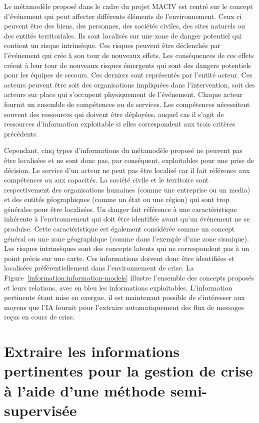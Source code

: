 Le métamodèle proposé dans le cadre du projet MACIV est centré sur le concept d'événement qui peut affecter différents éléments de l'environnement.
Ceux ci peuvent être des biens, des personnes, des sociétés civiles, des sites naturels ou des entités territoriales.
Ils sont localisés sur une zone de danger potentiel qui contient un risque intrinsèque.
Ces risques peuvent être déclenchés par l'événement qui crée à son tour de nouveaux effets.
Les conséquences de ces effets créent à leur tour de nouveaux risques émergents qui sont des dangers potentiels pour les équipes de secours.
Ces derniers sont représentés par l'entité acteur.
Ces acteurs peuvent être soit des organisations impliquées dans l'intervention, soit des acteurs sur place qui s'occupent physiquement de l'événement.
Chaque acteur fournit un ensemble de compétences ou de services.
Les compétences nécessitent souvent des ressources qui doivent être déployées, auquel cas il s'agit de ressources d'information
exploitable si elles correspondent aux trois critères précédents.

Cependant, cinq types d'informations du métamodèle proposé ne peuvent pas être
localisées et ne sont donc pas, par conséquent, exploitables pour une prise de décision.
Le service d'un acteur ne peut pas être localisé car il fait référence aux compétences
ou aux capacités. La société civile et le territoire sont respectivement des organisations
humaines (comme une entreprise ou un media) et des entités géographiques (comme
un état ou une région) qui sont trop générales pour être localisées. Un danger fait
référence à une caractéristique inhérente à l'environnement qui doit être identifiée
avant qu'un événement ne se produise. Cette caractéristique est également considérée
comme un concept général ou une zone géographique (comme dans l'exemple d'une
zone sismique). Les risques intrinsèques sont des concepts latents qui ne correspondent
pas à un point précis sur une carte. Ces informations doivent donc être identifiées
et localisées préférentiellement dans l'environnement de crise.
La Figure~\ref{information:information-models} illustre l'ensemble des concepts proposés et leurs relations, avec en bleu les informations exploitables.
L'information pertinente étant mise en exergue, il est maintenant
possible de s'intéresser aux moyens que l'IA fournit pour l'extraire automatiquement
des flux de messages reçus en cours de crise.

\section*{Extraire les informations pertinentes pour la gestion de crise à l'aide d'une méthode semi-supervisée}

